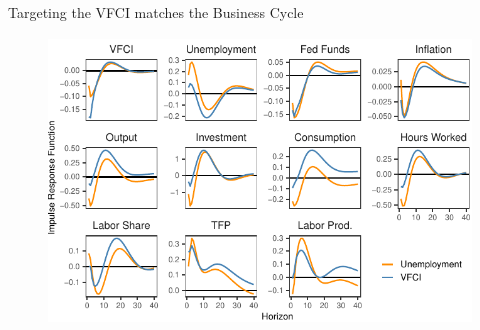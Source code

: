 \begin{frame}{Targeting the VFCI matches the Business Cycle}

  \begin{figure}
    \includegraphics[height = 3in]{figs/results-fig1-vfci_u_0632.pdf}
  \end{figure}

\end{frame}